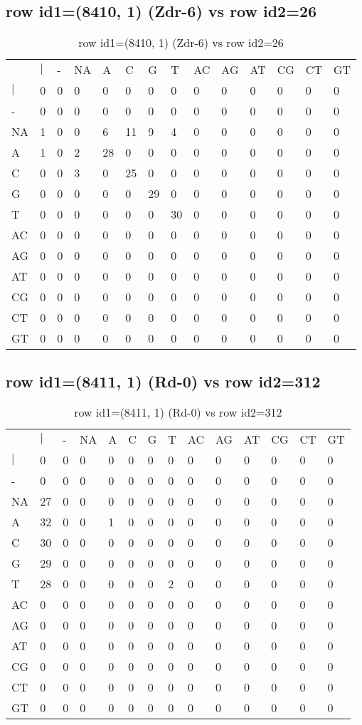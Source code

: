 \subsection{row id1=(8410, 1) (Zdr-6) vs row id2=26}
\begin{center}
\begin{longtable}{|l|l|l|l|l|l|l|l|l|l|l|l|l|l|}
\caption{row id1=(8410, 1) (Zdr-6) vs row id2=26} \label{table_dm488}\\
\hline
\\
\hline
&$|$&-&NA&A&C&G&T&AC&AG&AT&CG&CT&GT\\
$|$&0&0&0&0&0&0&0&0&0&0&0&0&0\\
-&0&0&0&0&0&0&0&0&0&0&0&0&0\\
NA&1&0&0&6&11&9&4&0&0&0&0&0&0\\
A&1&0&2&28&0&0&0&0&0&0&0&0&0\\
C&0&0&3&0&25&0&0&0&0&0&0&0&0\\
G&0&0&0&0&0&29&0&0&0&0&0&0&0\\
T&0&0&0&0&0&0&30&0&0&0&0&0&0\\
AC&0&0&0&0&0&0&0&0&0&0&0&0&0\\
AG&0&0&0&0&0&0&0&0&0&0&0&0&0\\
AT&0&0&0&0&0&0&0&0&0&0&0&0&0\\
CG&0&0&0&0&0&0&0&0&0&0&0&0&0\\
CT&0&0&0&0&0&0&0&0&0&0&0&0&0\\
GT&0&0&0&0&0&0&0&0&0&0&0&0&0\\
\hline
\end{longtable}
\end{center}

\subsection{row id1=(8411, 1) (Rd-0) vs row id2=312}
\begin{center}
\begin{longtable}{|l|l|l|l|l|l|l|l|l|l|l|l|l|l|}
\caption{row id1=(8411, 1) (Rd-0) vs row id2=312} \label{table_dm490}\\
\hline
\\
\hline
&$|$&-&NA&A&C&G&T&AC&AG&AT&CG&CT&GT\\
$|$&0&0&0&0&0&0&0&0&0&0&0&0&0\\
-&0&0&0&0&0&0&0&0&0&0&0&0&0\\
NA&27&0&0&0&0&0&0&0&0&0&0&0&0\\
A&32&0&0&1&0&0&0&0&0&0&0&0&0\\
C&30&0&0&0&0&0&0&0&0&0&0&0&0\\
G&29&0&0&0&0&0&0&0&0&0&0&0&0\\
T&28&0&0&0&0&0&2&0&0&0&0&0&0\\
AC&0&0&0&0&0&0&0&0&0&0&0&0&0\\
AG&0&0&0&0&0&0&0&0&0&0&0&0&0\\
AT&0&0&0&0&0&0&0&0&0&0&0&0&0\\
CG&0&0&0&0&0&0&0&0&0&0&0&0&0\\
CT&0&0&0&0&0&0&0&0&0&0&0&0&0\\
GT&0&0&0&0&0&0&0&0&0&0&0&0&0\\
\hline
\end{longtable}
\end{center}


